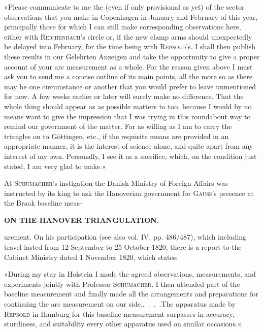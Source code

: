 \par\noindent\hspace*{\parindent}»Please communicate to me the  (even if only provisional as yet) of the sector observations that you make in Copenhagen in January and February of this year, principally those for which I can still make corresponding observations here, either with \textsc{Reichenbach}'s circle or, if the new clamp arms should unexpectedly be delayed into February, for the time being with \textsc{Repsold}'s. I shall then publish these results in our Gelehrten Anzeigen and take the opportunity to give a proper account of your arc measurement as a whole. For the reason given above I must ask you to send me a concise outline of its main points, all the more so as there may be one circumstance or another that you would prefer to leave unmentioned for now. A few weeks earlier or later will surely make no difference. That the whole thing should appear as  as possible matters to  too, because I would by no means want to give the impression that I was trying in this roundabout way to remind our government of the matter. For as willing as I am to carry the triangles on to Göttingen, etc., if the requisite means are provided in an appropriate manner, it is the interest of science alone, and quite apart from any interest of my own. Personally, I see it as a sacrifice, which, on the condition just stated, I am very glad to make.«

\par\noindent\hspace*{\parindent}At \textsc{Schumacher}'s instigation the Danish Ministry of Foreign Affairs was instructed by its king to ask the Hanoverian government for \textsc{Gauss}'s presence at the Braak baseline meas-\par

\clearpage
\noindent\null\hfill\textbf{ON THE HANOVER TRIANGULATION.}\hfill{}\par\medskip
\noindent urement. On his participation (see also vol. IV, pp. 486/487), which including travel lasted from 12 September to 25 October 1820, there is a report to the Cabinet Ministry dated 1 November 1820, which states:

\par\noindent\hspace*{\parindent}»During my stay in Holstein I made the agreed observations, measurements, and experiments jointly with Professor \textsc{Schumacher}. I then attended part of the baseline measurement and finally made all the arrangements and preparations for continuing the arc measurement on our side.\enspace .\ .\ .\ .\enspace The apparatus made by \textsc{Repsold} in Hamburg for this baseline measurement surpasses in accuracy, sturdiness, and suitability every other apparatus used on similar occasions.«

